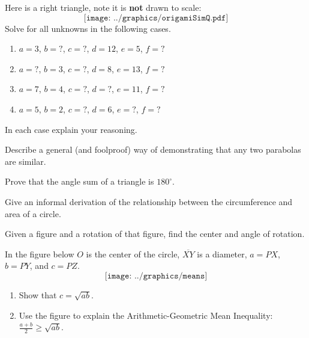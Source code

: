 \begin{prob}
Here is a right triangle, note it is \textbf{not} drawn to scale:
\[
\texttt{[image: ../graphics/origamiSimQ.pdf]}
\]
Solve for all unknowns in the following cases.
\begin{enumerate}
\item $a = 3$, $b = ?$, $c = ?$, $d = 12$, $e = 5$, $f = ?$
\item $a = ?$, $b = 3$, $c = ?$, $d =8$, $e = 13$, $f = ?$
\item $a = 7$, $b = 4$, $c = ?$, $d =?$, $e = 11$, $f = ?$
\item $a = 5$, $b = 2$, $c = ?$, $d =6$, $e = ?$, $f = ?$
\end{enumerate}
In each case explain your reasoning.
\end{prob}

\begin{prob}
Describe a general (and foolproof) way of demonstrating that any two parabolas are similar.
\end{prob}

\begin{prob}
Prove that the angle sum of a triangle is $180^\circ$.
\end{prob}

%
%
\begin{prob}
Give an informal derivation of the relationship between the circumference and area of a circle. 
\end{prob}

\begin{prob}
Given a figure and a rotation of that figure, find the center and angle of rotation.  
\end{prob}

\begin{prob}
In the figure below  $O$ is the center of the circle, $\overline{XY}$ is a diameter, $a = PX$, $b=PY$, and $c=PZ$.  
$$\texttt{[image: ../graphics/means]}$$
\begin{enumerate}
\item Show that $c=\sqrt{ab}$.  
\item Use the figure to explain the Arithmetic-Geometric Mean Inequality: $\frac{a+b}{2} \ge \sqrt{ab}$.  
\end{enumerate}
\end{prob}


